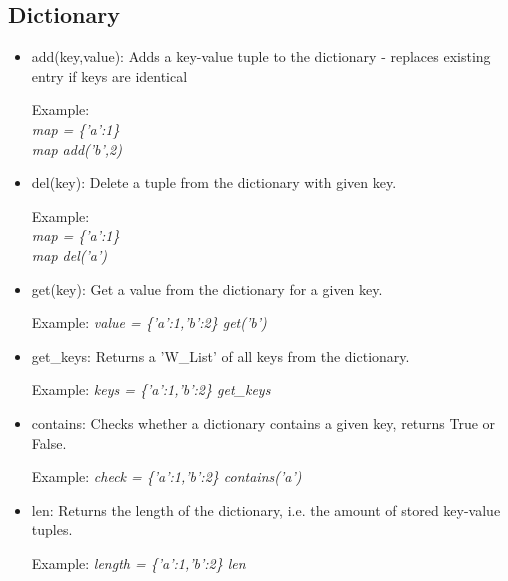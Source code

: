 \documentclass{article}
\begin{document}
\subsection{Dictionary}
\label{builtin_dict}
\begin{itemize}
\item add(key,value): Adds a key-value tuple to the dictionary - replaces existing entry if keys are identical

Example: \\ 
\textit{map = \{'a':1\} \\
map add('b',2)}

\item del(key): Delete a tuple from the dictionary with given key. 

Example: \\ 
\textit{map = \{'a':1\} \\
map del('a')}

\item get(key): Get a value from the dictionary for a given key.

Example: \textit{value = \{'a':1,'b':2\} get('b')}

\item get\_keys: Returns a 'W\_List' of all keys from the dictionary.

Example: \textit{keys = \{'a':1,'b':2\} get\_keys}

\item contains: Checks whether a dictionary contains a given key, returns True or False.

Example: \textit{check = \{'a':1,'b':2\} contains('a')}

\item len: Returns the length of the dictionary, i.e. the amount of stored key-value tuples.

Example: \textit{length = \{'a':1,'b':2\} len}

\end{itemize}
\end{document}
